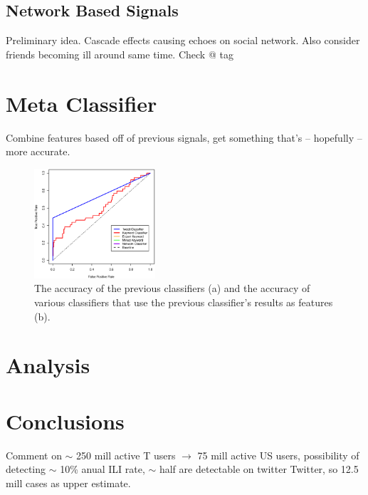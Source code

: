 \documentclass{acm_proc_article-sp}
\begin{document}
\subsection{Network Based Signals}

Preliminary idea. Cascade effects causing echoes on social network. Also consider friends becoming ill around same time. Check @ tag

\section{Meta Classifier}

Combine features based off of previous signals, get something that's -- hopefully -- more accurate.


\begin{figure} [h]
\centering
\includegraphics[width=0.4\textwidth]{figs/meta_roc.eps}
\caption{The accuracy of the previous classifiers (a) and the accuracy of various classifiers that use the previous classifier's results as features (b). }
\label{fig:roc_meta}
\end{figure}

\section{Analysis}

\section{Conclusions}

Comment on \(\sim\) 250 mill active T users \(\to\) 75 mill active US users, possibility of detecting \(\sim\) 10\% anual ILI rate, \(\sim\) half are detectable on twitter Twitter, so 12.5 mill cases as upper estimate.

\end{document}

